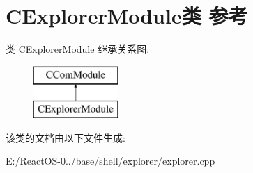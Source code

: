 \hypertarget{class_c_explorer_module}{}\section{C\+Explorer\+Module类 参考}
\label{class_c_explorer_module}
类 C\+Explorer\+Module 继承关系图\+:\begin{figure}[H]
\begin{center}
\leavevmode
\includegraphics[height=2.000000cm]{class_c_explorer_module}
\end{center}
\end{figure}


该类的文档由以下文件生成\+:\begin{DoxyCompactItemize}
\item 
E\+:/\+React\+O\+S-\/0../base/shell/explorer/explorer.\+cpp\end{DoxyCompactItemize}
